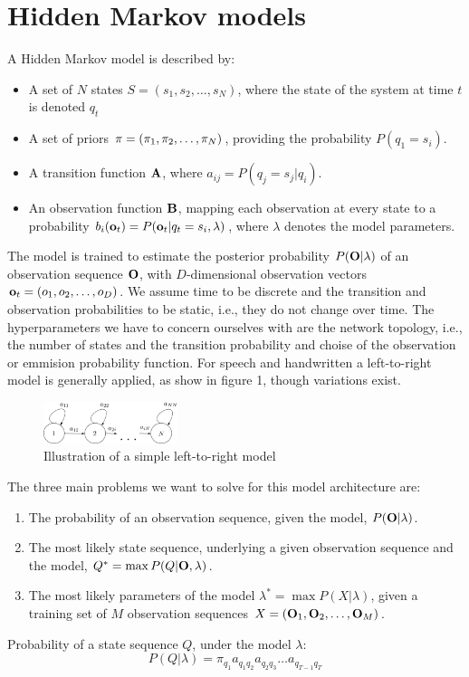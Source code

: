 \documentclass[conference]{IEEEtran}
\begin{document}
\section{Hidden Markov models}
A Hidden Markov model is described by:
\begin{itemize}
 \item A set of $N$ states $S = (s_{1}, s_{2}, \ldots, s_{N})$, where the state of the system at time $t$ is denoted $q_{t}$
 \item A set of priors ${\bf \pi} = (\pi_{1}, \pi_{2}, \ldots, \pi_{N})$, providing the probability $P(q_{1} = s_{i})$.
 \item A transition function ${\bf A}$, where $a_{ij} = P(q_{j} = s_{j} | q_{i})$. 
 \item An observation function ${\bf B}$, mapping each observation at every state to a probability $b_{i}({\bf o}_{t}) = P({\bf o}_{t} | q_{t} = s_{i}, \lambda)$, where $\lambda$ denotes the model parameters.
\end{itemize}
The model is trained to estimate the posterior probability $P({\bf O}|\lambda)$ of an observation sequence ${\bf O}$, with $D$-dimensional observation vectors ${\bf o}_{t} = (o_{1},o_{2},\ldots,o_{D})$. We assume time to be discrete and the transition and observation probabilities to be static, i.e., they do not change over time. The hyperparameters we have to concern ourselves with are the network topology, i.e., the number of states and the transition probability and choise of the observation or emmision probability function. For speech and handwritten a left-to-right model is generally applied, as show in figure 1, though variations exist.\\
\begin{figure}[H]
 \centering
\includegraphics[width=0.35\textwidth]{hmm.jpg}
\caption{Illustration of a simple left-to-right model}
\end{figure}
The three main problems we want to solve for this model architecture are:
\begin{enumerate}
 \item The probability of an observation sequence, given the model, $P({\bf O}|\lambda)$.
 \item The most likely state sequence, underlying a given observation sequence and the model, $Q^* = \max P(Q|{\bf O},\lambda)$.
 \item The most likely parameters of the model $\lambda^* = \max P(X|\lambda)$, given a training set of $M$ observation sequences $X = ({\bf O}_{1}, {\bf O}_{2}, \ldots, {\bf O}_{M} )$.
\end{enumerate}
Probability of a state sequence $Q$, under the model $\lambda$:
\begin{equation}
 P(Q|\lambda) = \pi_{q_{1}}a_{q_{1}q_{2}} a_{q_{2}q_{3}} \ldots a_{q_{T-1}q_{T}}
\end{equation}
\end{document}
